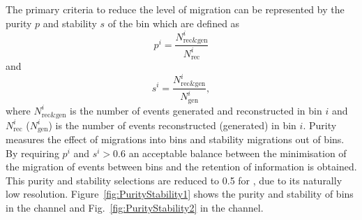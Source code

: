 The primary criteria to reduce the level of migration can be represented by the purity $p$ and stability $s$ of the bin which are defined as
\begin{equation*}
p^{i} = \frac{N^{i}_{\mathrm{rec\&gen}}}{N^{i}_{\mathrm{rec}}}
\end{equation*}
and
\begin{equation*}
s^{i} = \frac{N^{i}_{\mathrm{rec\&gen}}}{N^{i}_{\mathrm{gen}}},
\end{equation*}
where $N^{i}_{\mathrm{rec\&gen}}$ is the number of events generated and reconstructed in bin $i$ and $N^{i}_{\mathrm{rec}}$ ($N^{i}_{\mathrm{gen}}$) is the number of events reconstructed (generated) in bin $i$.  
Purity measures the effect of migrations into bins and stability migrations out of bins.
By requiring $p^{i}$ and $s^{i}>0.6$ an acceptable balance between the minimisation of the migration of events between bins and the retention of information is obtained.
This purity and stability selections are reduced to 0.5 for \ptmiss{}, due to its naturally low resolution.
Figure~\ref{fig:PurityStability1} shows the purity and stability of bins in the \eJets{} channel and Fig.~\ref{fig:PurityStability2} in the \muJets{} channel.


